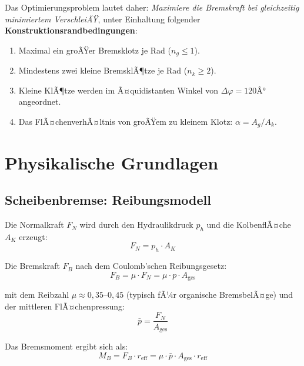 ﻿\documentclass[12pt,a4paper]{article}
\theoremstyle{definition}
\begin{document}
Das Optimierungsproblem lautet daher: \emph{Maximiere die Bremskraft bei
gleichzeitig minimiertem VerschleiÃŸ}, unter Einhaltung folgender
\textbf{Konstruktionsrandbedingungen}:

\begin{enumerate}[leftmargin=2em]
  \item Maximal ein groÃŸer Bremsklotz je Rad ($n_g \leq 1$).
  \item Mindestens zwei kleine BremsklÃ¶tze je Rad ($n_k \geq 2$).
  \item Kleine KlÃ¶tze werden im Ã¤quidistanten Winkel von $\Delta\varphi = 120Â°$
        angeordnet.
  \item Das FlÃ¤chenverhÃ¤ltnis von groÃŸem zu kleinem Klotz: $\alpha = A_g/A_k$.
\end{enumerate}

\section{Physikalische Grundlagen}

\subsection{Scheibenbremse: Reibungsmodell}

Die Normalkraft $F_N$ wird durch den Hydraulikdruck $p_h$ und die
KolbenflÃ¤che $A_K$ erzeugt:
\begin{equation}
  F_N = p_h \cdot A_K
  \label{eq:normalkraft}
\end{equation}

Die Bremskraft $F_B$ nach dem Coulomb'schen Reibungsgesetz:
\begin{equation}
  F_B = \mu \cdot F_N = \mu \cdot p \cdot A_{\text{ges}}
  \label{eq:bremskraft}
\end{equation}

mit dem Reib\-zahl $\mu \approx 0{,}35$--$0{,}45$ (typisch fÃ¼r organische
BremsbelÃ¤ge) und der mittleren FlÃ¤chenpressung:
\begin{equation}
  \bar{p} = \frac{F_N}{A_{\text{ges}}}
  \label{eq:pressung}
\end{equation}

Das Bremsmoment ergibt sich als:
\begin{equation}
  M_B = F_B \cdot r_{\text{eff}}
      = \mu \cdot \bar{p} \cdot A_{\text{ges}} \cdot r_{\text{eff}}
  \label{eq:bremsmoment}
\end{equation}
\end{document}
